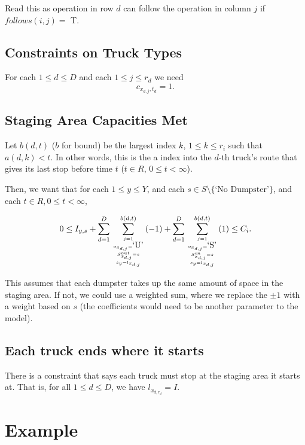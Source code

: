 \documentclass{article}
\begin{document}
Read this as operation in row $d$ can follow the operation in column $j$ if $follows(i,j) = $ T.

\subsection{Constraints on Truck Types}

For each $ 1 \le d \le D$ and each $1 \le j \le r_d $
we need $$ c_{x_{d,j},t_{d}} = 1 .$$

\subsection{Staging Area Capacities Met}

Let $b(d,t) $ ($b$ for bound) be the largest index $k$, $1 \le k \le r_i$ such that $a(d, k) < t$.
In other words, this is the a index into the $d$-th truck's route that gives its last stop before time $t$ ($t \in R$, $0 \le t < \infty $).

Then, we want that for each $1 \le y \le Y$, and each $s \in S \setminus \{\mbox{`No Dumpster'}\}$, and each $t \in R, 0 \le t < \infty $,

$$0 \le I_{y, s} 
 + \sum_{d=1}^D \sum^{b(d,t)} _{j=1 \atop { o_{x_{d,j}}  = \mbox{`U'} \atop   { S^{out}_{x_{d,j}} = s  \atop  s_y = l_{x_{d,j}}  }      }} (-1)
 + \sum_{d=1}^D \sum^{b(d,t)} _{j=1 \atop { o_{x_{d,j}}  = \mbox{`S'} \atop   { S^{in }_{x_{d,j}} = s  \atop  s_y = l_{x_{d,j}}  }      }} ( 1) \le C_i.$$
 
This assumes that each dumpster takes up the same amount of space in the staging area.
If not, we could use a weighted sum, where we replace the $\pm 1$ with a weight based on $s$
(the coefficients would need to be another parameter to the model).

\subsection{Each truck ends where it starts}
There is a constraint that says each truck must stop at the staging area it starts at.
That is, for all $1 \le d \le D$, we have $l_{x_{d, r_d}} = I$.

\section{Example}

\end{document}
